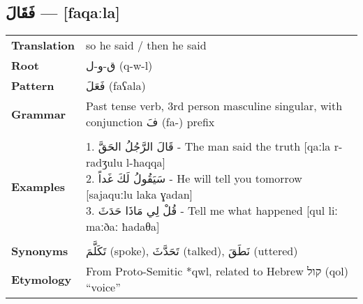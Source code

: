 \documentclass[letter,12pt]{article}
\begin{document}
\subsection{\textarabic{فَقَالَ} — [faqaːla]}
\begin{tabular}{p{3cm}p{10cm}}
\toprule

\textbf{Translation} & so he said / then he said \\
\textbf{Root} & \textarabic{ق-و-ل} (q-w-l) \\
\textbf{Pattern} & \textarabic{فَعَلَ} (faʕala) \\
\textbf{Grammar} & Past tense verb, 3rd person masculine singular, with conjunction \textarabic{فَ} (fa-) prefix \\
\midrule \\
\textbf{Examples} & \makecell[l]{\parbox{9.5cm}{
1. \textarabic{قَالَ الرَّجُلُ الحَقَّ} - The man said the truth [qaːla r-radʒulu l-ħaqqa]\\
2. \textarabic{سَيَقُولُ لَكَ غَداً} - He will tell you tomorrow [sajaquːlu laka ɣadan]\\
3. \textarabic{قُلْ لِي مَاذَا حَدَثَ} - Tell me what happened [qul liː maːðaː ħadaθa]
} } \\
\midrule \\
\textbf{Synonyms} & \textarabic{تَكَلَّمَ} (spoke), \textarabic{تَحَدَّثَ} (talked), \textarabic{نَطَقَ} (uttered) \\
\textbf{Etymology} & From Proto-Semitic *qwl, related to Hebrew \texthebrew{קול} (qol) ``voice'' \\
\bottomrule
\end{tabular}
\end{document}
